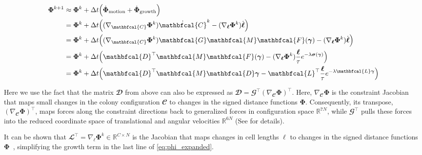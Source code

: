 \documentclass[conference]{IEEEtran}
\begin{document}
\begin{equation}\label{eq:phi_expanded}
    \small
    \begin{split}
        \mathbf{\Phi}^{k+1} & \approx \mathbf{\Phi}^k + \Delta t \Bigl( \dot{\mathbf{\Phi}}_{\text{motion}} + \dot{\mathbf{\Phi}}_{\text{growth}} \Bigr)\\
        & = \mathbf{\Phi}^k + \Delta t \Bigl( (\nabla_{\mathbfcal{C}} \mathbf{\Phi}^k) \dot{\mathbfcal{C}}^k - (\nabla_{\boldsymbol{\ell}} \mathbf{\Phi}^k) \dot{\boldsymbol{\ell}} \Bigr)\\
        & = \mathbf{\Phi}^k + \Delta t \Bigl( (\nabla_{\mathbfcal{C}} \mathbf{\Phi}^k) \mathbfcal{G} \mathbfcal{M}  \mathbfcal{F}(\boldsymbol{\gamma}) - (\nabla_{\boldsymbol{\ell}} \mathbf{\Phi}^k) \dot{\boldsymbol{\ell}} \Bigr)\\
        & = \mathbf{\Phi}^k + \Delta t \Bigl( \mathbfcal{D}^\top \mathbfcal{M}  \mathbfcal{F}(\boldsymbol{\gamma}) - (\nabla_{\boldsymbol{\ell}} \mathbf{\Phi}^k) \frac{\boldsymbol{\ell}}{\tau} e^{-\lambda  \boldsymbol{\sigma}(\boldsymbol{\gamma})} \Bigr)\\
        & = \mathbf{\Phi}^k + \Delta t \Bigl( \mathbfcal{D}^\top \mathbfcal{M} \mathbfcal{D} \boldsymbol{\gamma} - \mathbfcal{L}^\top \frac{\boldsymbol{\ell}}{\tau} e^{-\lambda \mathbfcal{L} \boldsymbol{\gamma}} \Bigr)
    \end{split}
\end{equation}


Here we use the fact that the matrix $\mathbfcal{D}$ from above can also be expressed as $\mathbfcal{D} = \mathbfcal{G}^\top (\nabla_{\mathbfcal{C}} \mathbf{\Phi})^\top$. Here, $\nabla_{\mathbfcal{C}} \mathbf{\Phi}$ is the constraint Jacobian that maps small changes in the colony configuration $\mathbfcal{C}$ to changes in the signed distance functions $\mathbf{\Phi}$. Consequently, its transpose, $(\nabla_{\mathbfcal{C}} \mathbf{\Phi})^\top$, maps forces along the constraint directions back to generalized forces in configuration space $\mathbb{R}^{7N}$, while $\mathbfcal{G}^\top$ pulls these forces into the reduced coordinate space of translational and angular velocities $\mathbb{R}^{6N}$ (See \cite{Weady2024SM, Tasora2008} for details).

It can be shown that $\mathbfcal{L}^\top = \nabla_{\boldsymbol{\ell}} \mathbf{\Phi}^k \in \mathbb{R}^{C \times N}$ is the Jacobian that maps changes in cell lengths $\boldsymbol{\ell}$ to changes in the signed distance functions $\mathbf{\Phi}$~\cite{Weady2024SM}, simplifying the growth term in the last line of \autoref{eq:phi_expanded}.
\end{document}
